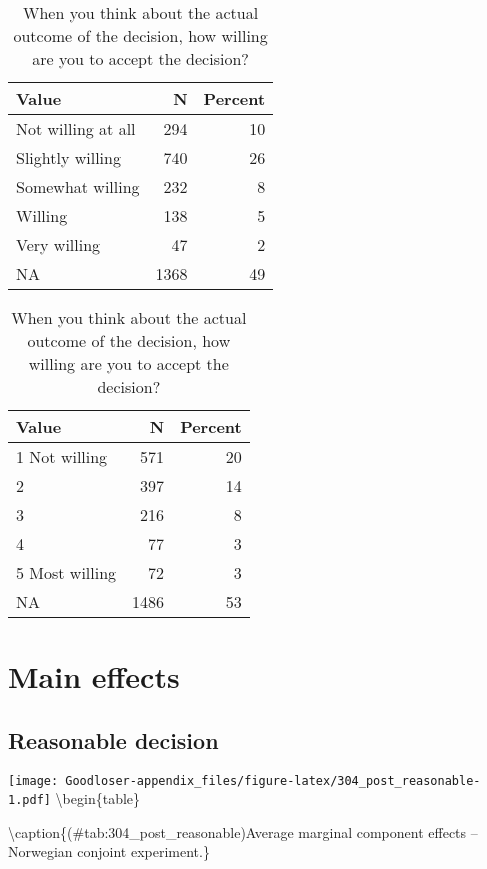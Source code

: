 \documentclass[
]{book}
\begin{document}
\begin{table}[H]

\caption{\label{tab:unnamed-chunk-4}When you think about the actual outcome of the decision, how willing are you to accept the decision?}
\centering
\begin{tabular}[t]{lrr}
\toprule
Value & N & Percent\\
\midrule
Not willing at all & 294 & 10\\
Slightly willing & 740 & 26\\
Somewhat willing & 232 & 8\\
Willing & 138 & 5\\
Very willing & 47 & 2\\
NA & 1368 & 49\\
\bottomrule
\end{tabular}
\end{table}

\begin{table}[H]

\caption{\label{tab:unnamed-chunk-4}When you think about the actual outcome of the decision, how willing are you to accept the decision?}
\centering
\begin{tabular}[t]{lrr}
\toprule
Value & N & Percent\\
\midrule
1 Not willing & 571 & 20\\
2 & 397 & 14\\
3 & 216 & 8\\
4 & 77 & 3\\
5 Most willing & 72 & 3\\
NA & 1486 & 53\\
\bottomrule
\end{tabular}
\end{table}

\hypertarget{main-effects-2}{%
\chapter{Main effects}\label{main-effects-2}}

\hypertarget{reasonable-decision}{%
\section{Reasonable decision}\label{reasonable-decision}}

\texttt{[image: Goodloser-appendix\_files/figure-latex/304\_post\_reasonable-1.pdf]} \textbackslash begin\{table\}

\textbackslash caption\{(\#tab:304\_post\_reasonable)Average marginal component effects -- Norwegian conjoint experiment.\}
\centering
\end{document}
